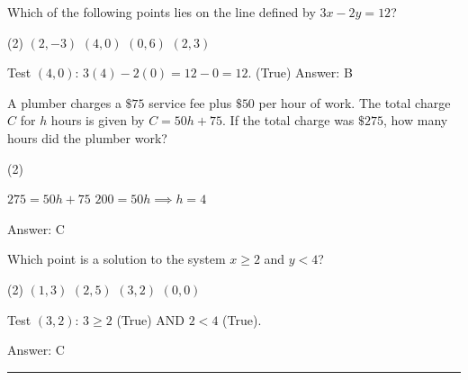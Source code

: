 \documentclass[11pt,paper=a4,answers]{exam}
\begin{document}
\begin{questions}
\vspace{1cm}

\question
Which of the following points lies on the line defined by $3x - 2y = 12$?
\begin{tasks}(2)
\task $(2, -3)$ \task $(4, 0)$ \task $(0, 6)$ \task $(2, 3)$
\end{tasks}

\begin{solution}
Test $(4, 0)$: $3(4) - 2(0) = 12 - 0 = 12$. (True)
\vspace{5pt}
Answer: \colorbox{yellow!100}{B}
\end{solution}

\vspace{1cm}

\question
A plumber charges a $\$75$ service fee plus $\$50$ per hour of work. The total charge $C$ for $h$ hours is given by $C = 50h + 75$. If the total charge was $\$275$, how many hours did the plumber work?
\begin{tasks}(2)
   
\end{tasks}

\begin{solution}
\begin{center}
$275 = 50h + 75$
\vspace{5pt}
$200 = 50h \implies h = 4$
\end{center}
\vspace{5pt}
Answer: \colorbox{yellow!100}{C}
\end{solution}

\vspace{1cm}

\question
\begin{center}
\end{center}
Which point is a solution to the system $x \geq 2$ and $y < 4$?
\begin{tasks}(2)
\task $(1, 3)$ \task $(2, 5)$ \task $(3, 2)$ \task $(0, 0)$
\end{tasks}

\begin{solution}
\begin{center}
Test $(3, 2)$: $3 \geq 2$ (True) AND $2 < 4$ (True).
\end{center}
\vspace{5pt}
Answer: \colorbox{yellow!100}{C}
\end{solution}

\end{questions}
\begin{center}
\rule{.5\textwidth}{1pt}
\end{center}
\end{document}
